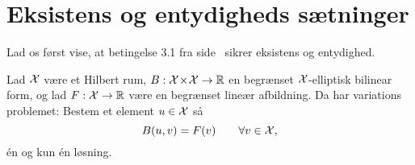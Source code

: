 \section{Eksistens og entydigheds sætninger} \label{eks-ent}
Lad os først vise, at betingelse 3.1 fra side~\pageref{cond31} sikrer
eksistens og entydighed.
\begin{theorem}
Lad $\mathcal{X}$ være et Hilbert rum,
$B:\mathcal{X}\!\times\!\mathcal{X}\rightarrow\mathbb{R}$ en begrænset $\mathcal{X}$-elliptisk
bilinear form, og lad $F:\mathcal{X}\rightarrow\mathbb{R}$ være en begrænset lineær
afbildning. Da har variations problemet: Bestem et element $u\in\mathcal{X}$ så
\begin{equation} \label{app:var-prob}
B(u,v)=F(v) \qquad \forall v\in\mathcal{X},
\end{equation} 
\'{e}n og kun \'{e}n løsning.
\end{theorem}
